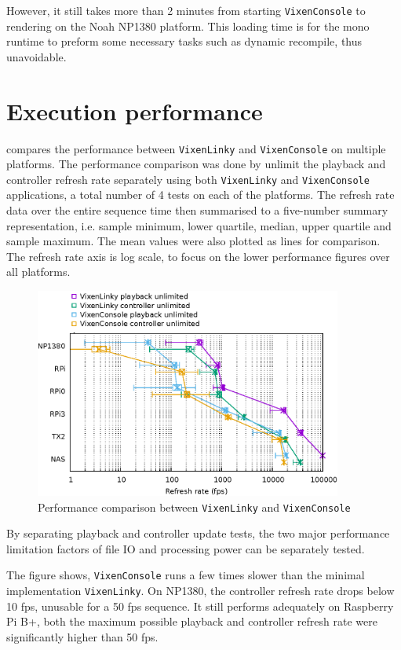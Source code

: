However, it still takes more than 2 minutes from starting \texttt{VixenConsole} to rendering on the Noah NP1380 platform. This loading time is for the mono runtime to preform some necessary tasks such as dynamic recompile, thus unavoidable.

\section{Execution performance}

 compares the performance between \texttt{VixenLinky} and \texttt{VixenConsole} on multiple platforms. The performance comparison was done by unlimit the playback and controller refresh rate separately using both \texttt{VixenLinky} and \texttt{VixenConsole} applications, a total number of 4 tests on each of the platforms. The refresh rate data over the entire sequence time then summarised to a five-number summary representation, i.e. sample minimum, lower quartile, median, upper quartile and sample maximum. The mean values were also plotted as lines for comparison. The refresh rate axis is log scale, to focus on the lower performance figures over all platforms.

\begin{figure}[t]
  \centering
  \includegraphics[width=0.9\textwidth]{Figs/raw-seq-p-c.eps}
  \caption{\footnotesize Performance comparison between \texttt{VixenLinky} and \texttt{VixenConsole}}
  \label{fig:raw-seq-p-c}
\end{figure}

By separating playback and controller update tests, the two major performance limitation factors of file IO and processing power can be separately tested.

The figure shows, \texttt{VixenConsole} runs a few times slower than the minimal implementation \texttt{VixenLinky}. On NP1380, the controller refresh rate drops below 10 fps, unusable for a 50 fps sequence. It still performs adequately on Raspberry Pi B+, both the maximum possible playback and controller refresh rate were significantly higher than 50 fps.

